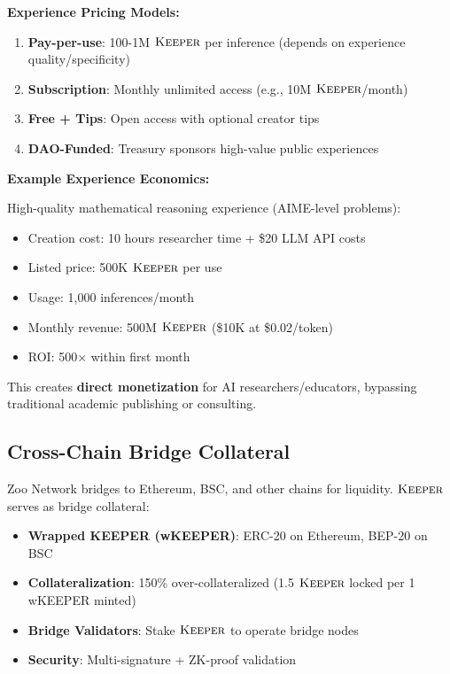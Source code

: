 \documentclass[11pt,letterpaper]{article}
\theoremstyle{definition}
\theoremstyle{remark}
\newcommand{\KEEPER}{\textsc{Keeper}}
\begin{document}
\textbf{Experience Pricing Models:}
\begin{enumerate}
\item \textbf{Pay-per-use}: 100-1M $\KEEPER$ per inference (depends on experience quality/specificity)
\item \textbf{Subscription}: Monthly unlimited access (e.g., 10M $\KEEPER$/month)
\item \textbf{Free + Tips}: Open access with optional creator tips
\item \textbf{DAO-Funded}: Treasury sponsors high-value public experiences
\end{enumerate}

\textbf{Example Experience Economics:}

High-quality mathematical reasoning experience (AIME-level problems):
\begin{itemize}
\item Creation cost: 10 hours researcher time + \$20 LLM API costs
\item Listed price: 500K $\KEEPER$ per use
\item Usage: 1,000 inferences/month
\item Monthly revenue: 500M $\KEEPER$ (\$10K at \$0.02/token)
\item ROI: 500× within first month
\end{itemize}

This creates \textbf{direct monetization} for AI researchers/educators, bypassing traditional academic publishing or consulting.

\subsection{Cross-Chain Bridge Collateral}

Zoo Network bridges to Ethereum, BSC, and other chains for liquidity. $\KEEPER$ serves as bridge collateral:

\begin{itemize}
\item \textbf{Wrapped KEEPER (wKEEPER)}: ERC-20 on Ethereum, BEP-20 on BSC
\item \textbf{Collateralization}: 150\% over-collateralized (1.5 $\KEEPER$ locked per 1 wKEEPER minted)
\item \textbf{Bridge Validators}: Stake $\KEEPER$ to operate bridge nodes
\item \textbf{Security}: Multi-signature + ZK-proof validation
\end{itemize}
\end{document}
